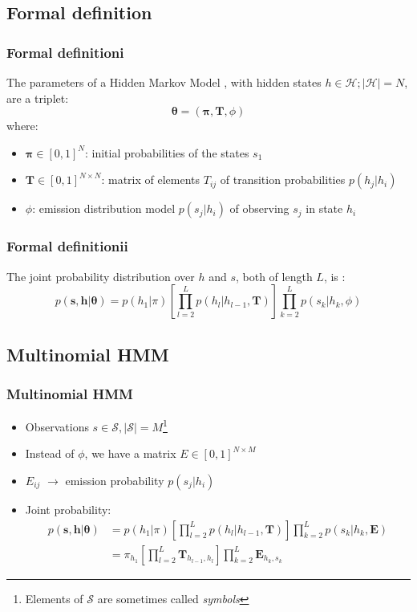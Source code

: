 \documentclass[11pt]{beamer}
\newcommand{\vect}[1]{\boldsymbol{\mathbf{#1}}}
\begin{document}
    \subsection{Formal definition}
    \begin{frame}
        \frametitle{Formal definition\quad i}
        The parameters of a Hidden Markov Model \cite{Bishop2006}, with hidden states $h \in \mathcal{H};|\mathcal{H}|=N$, are a triplet:
        $$
            \vect{\theta} = (\vect{\pi}, \vect{T}, \phi)
        $$
        where:
        \begin{itemize}
            \item $\vect{\pi} \in [0,1]^N$: initial probabilities of the states $s_1$
            \item $\vect{T} \in [0,1]^{N\times N}$: matrix of elements $T_{ij}$ of transition probabilities $p(h_j|h_i)$
            \item $\phi$: emission distribution model $p(s_j|h_i)$ of observing $s_j$ in state $h_i$
        \end{itemize}
    \end{frame}
    
    \begin{frame}
        \frametitle{Formal definition\quad ii}
        The joint probability distribution over $h$ and $s$, both of length $L$, is \cite{Bishop2006}:
        $$
        p(\vect{s}, \vect{h}|\vect{\theta}) = p(h_1|\pi)\left[\prod_{l=2}^L p(h_l|h_{l-1}, \vect{T})\right]\prod_{k=2}^L p(s_k|h_k, \phi)
        $$
     \end{frame}
   
    \subsection{Multinomial HMM}
    \begin{frame}
        \frametitle{Multinomial HMM}
        \begin{itemize}
            \item Observations $s \in \mathcal{S}, |\mathcal{S}|=M$\footnote{Elements of $\mathcal{S}$ are sometimes called \emph{symbols}}
            \item Instead of $\phi$, we have a matrix $E \in [0,1]^{N\times M}$
            \item $E_{ij}$ $\rightarrow$ emission probability $p(s_j|h_i)$
            \item Joint probability:
            \begin{align*}
            p(\vect{s}, \vect{h}|\vect{\theta}) &= p(h_1|\pi)\left[\prod_{l=2}^L p(h_l|h_{l-1}, \vect{T})\right]\prod_{k=2}^L p(s_k|h_k, \vect{E})\\
                                                      &= \pi_{h_1} \left[\prod_{l=2}^L \vect{T}_{h_{l-1},h_l}\right] \prod_{k=2}^L \vect{E}_{h_k,s_k}
            \end{align*}
        \end{itemize}
    \end{frame}
   
\end{document}
